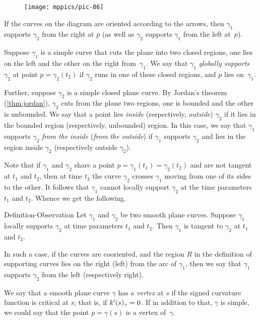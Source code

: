 \begin{wrapfigure}[8]{o}{43 mm}
\vskip-4mm
\centering
\texttt{[image: mppics/pic-86]}
\vskip0mm
\end{wrapfigure}

If the curves on the diagram are oriented according to the arrows, then $\gamma_1$ supports $\gamma_2$ from the right at $p$ (as well as $\gamma_2$ supports $\gamma_1$ from the left at~$p$).

Suppose $\gamma_1$ is a simple curve that cuts the plane into two closed regions, one lies on the left and the other on the right from~$\gamma_1$.
We say that $\gamma_1$ \emph{globally supports} $\gamma_2$ at point $p=\gamma_2(t_2)$ 
if $\gamma_2$ runs in one of these closed regions, and 
$p$ lies on~$\gamma_1$.

Further, suppose $\gamma_2$ is a simple closed plane curve.
By Jordan's theorem (\ref{thm:jordan}), $\gamma_2$ cuts from the plane two regions, one is bounded and the other is unbounded.
We say that a point lies {}\emph{inside} (respectively, {}\emph{outside}) $\gamma_2$ if it lies in the bounded region (respectively, unbounded) region.
In this case, we say that $\gamma_1$ supports $\gamma_2$ \emph{from the inside} (\emph{from the outside}) if $\gamma_1$ supports $\gamma_2$ and lies in the region inside $\gamma_2$ (respectively outside $\gamma_2$). 

Note that if $\gamma_1$ and $\gamma_2$ share a point $p=\gamma_1(t_1)=\gamma_2(t_2)$ and are not tangent at $t_1$ and $t_2$, then at time $t_2$ the curve $\gamma_2$ crosses $\gamma_1$  moving from one of its sides to the other.
It follows that $\gamma_1$ cannot locally support $\gamma_2$ at the time parameters $t_1$ and $t_2$.
Whence we get the following.

\begin{thm}{Definition-Observation}
Let $\gamma_1$ and $\gamma_2$ be two smooth plane curves.
Suppose $\gamma_1$ locally supports $\gamma_2$ at time parameters $t_1$ and $t_2$.
Then $\gamma_1$ is tangent to $\gamma_2$ at $t_1$ and $t_2$.

In such a case, if the curves are cooriented, and the region $R$ in the definition of supporting curves lies on the right (left) from the arc of $\gamma_1$, then we say that 
$\gamma_1$ supports $\gamma_2$ from the left (respectively right).
\end{thm}

We say that a smooth plane curve $\gamma$ has a \emph{vertex} at $s$
if the signed curvature function is critical at $s$;
that is, if $k'(s)_\gamma=0$.
If in addition to that, $\gamma$ is simple, we could say that the point $p=\gamma(s)$ is a vertex of~$\gamma$.


